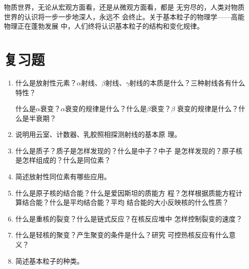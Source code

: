 物质世界，无论从宏观方面看，还是从微观方面看，都是
无穷尽的，人类对物质世界的认识将一步一步地深人，永远不
会终止。关于基本粒子的物理学——高能物理正在蓬勃发展
中，人们终将认识基本粒子的结构和变化规律。


\section*{复习题}
\begin{enumerate}
    \item 什么是放射性元素？$\alpha$射线、$\beta$射线、$\gamma$射线的本质是什么？三种射线各有什么特性？

    什么是$\alpha$衰变？$\alpha$衰变的规律是什么？什么是$\beta$衰变？$\beta$
    衰变的规律是什么？什么是半衰期？
    \item 说明用云室、计数器、乳胶照相探测射线的基本原
    理。
    \item 什么是质子？质子是怎样发现的？什么是中子？中子
    是怎样发现的？原子核是怎样组成的？什么是同位素？
    \item 简述放射性同位素有哪些应用。
    \item 什么是原子核的结合能？什么是爱因斯坦的质能方
    程？怎样根据质能方程计算结合能？什么是平均结合能？平均
    结合能的大小反映核的什么性质？
    \item 什么是重核的裂变？什么是链式反应？在核反应堆中
    怎样控制裂变的速度？
    \item 什么是轻核的聚变？产生聚变的条件是什么？研究
    可控热核反应有什么意义？
    \item 简述基本粒子的种类。
\end{enumerate}


